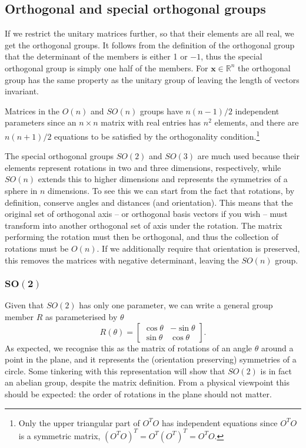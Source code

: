 \documentclass[notes.tex]{subfiles}
\begin{document}
\subsection{Orthogonal and special orthogonal groups}
If we restrict the unitary matrices further, so that their elements are all real,  we get the orthogonal groups.
It follows from the definition of the orthogonal group that the determinant of the members is either 1 or $-1$, thus the special orthogonal group is simply one half of the members. For $\mathbf{x} \in \mathbb{R}^n$ the orthogonal group has the same property as the unitary group of leaving the length of vectors invariant. 

Matrices in the $O(n)$ and $SO(n)$ groups have $n(n-1)/2$ independent parameters since an $n\times n$ matrix with real entries has $n^2$ elements, and there are $n(n+1)/2$ equations to be satisfied by the orthogonality condition.\footnote{Only the upper triangular part of $O^TO$ has independent equations since $O^TO$ is a symmetric matrix, $(O^TO)^T=O^T(O^T)^T=O^TO$. } 

The special orthogonal groups $SO(2)$ and $SO(3)$ are much used because their elements represent rotations in two and three dimensions, respectively, while $SO(n)$ extends this to higher dimensions and represents the symmetries of a sphere in $n$ dimensions. To see this we can start from the fact that rotations, by definition, conserve angles and distances (and orientation). This means that the original set of orthogonal axis -- or orthogonal basis vectors if you wish -- must transform into another orthogonal set of axis under the rotation. The matrix performing the rotation must then be orthogonal, and thus  the collection of rotations must be $O(n)$. If we additionally require that orientation is preserved, this removes the matrices with negative determinant, leaving the $SO(n)$ group.

\subsubsection{$\mathbf{SO(2)}$}
Given that $SO(2)$ has only one parameter, we can write a general group member $R$ as parameterised by $\theta$
\begin{equation}
R(\theta)=\left[\begin{matrix} \cos\theta &  -\sin\theta \\ \sin\theta&  \cos\theta \end{matrix}\right].
\label{eq:SO2_parameterisation}
\end{equation}
As expected, we recognise this as the matrix of rotations of an angle $\theta$ around a point in the plane, and it represents the (orientation preserving) symmetries of a circle. Some tinkering with this representation will show that $SO(2)$ is in fact an abelian group, despite the matrix definition. From a physical viewpoint this should be expected: the order of rotations in the plane should not matter.
\end{document}
